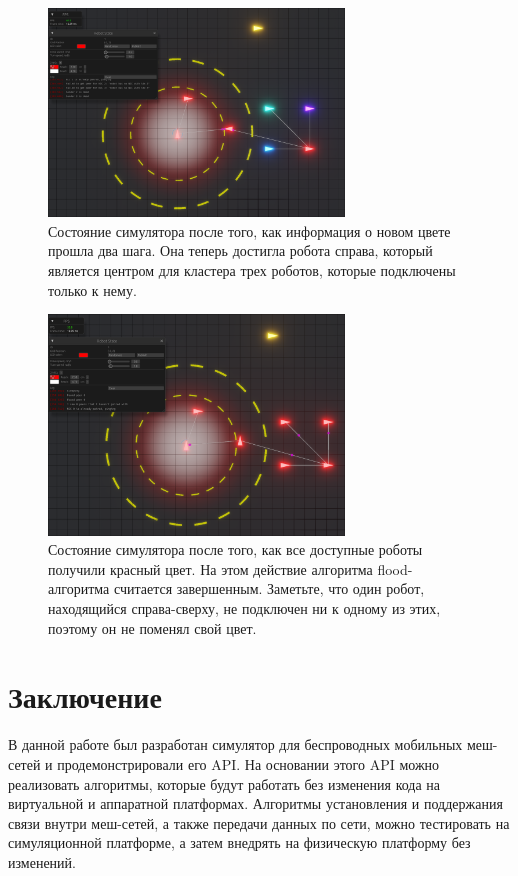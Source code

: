 \documentclass[%
]{report}
\begin{document}
\begin{figure}[p]
  \centering
  \includegraphics[width = 0.7\textwidth]{colors-3.png}
  \caption{Состояние симулятора после того, как информация о новом цвете прошла два шага. Она теперь достигла робота справа,
  который является центром для кластера трех роботов, которые подключены только к нему.}
  \label{wave3}
\end{figure}

\begin{figure}[p]
  \centering
  \includegraphics[width = 0.7\textwidth]{colors-4.png}
  \caption{Состояние симулятора после того, как все доступные роботы получили красный цвет. На этом действие алгоритма flood-алгоритма
  считается завершенным. Заметьте, что один робот,
  находящийся справа-сверху, не подключен ни к одному из этих, поэтому он не поменял свой цвет.}
  \label{wave4}
\end{figure}


\chapter*{Заключение}

В данной работе был разработан симулятор для беспроводных мобильных меш-сетей
и продемонстрировали его API.
На основании этого API можно реализовать алгоритмы, которые будут
работать без изменения кода на виртуальной и аппаратной платформах.
Алгоритмы установления и поддержания связи внутри меш-сетей,
а также передачи данных по сети,
можно тестировать на симуляционной платформе,
а затем внедрять на физическую платформу без изменений.
\end{document}
